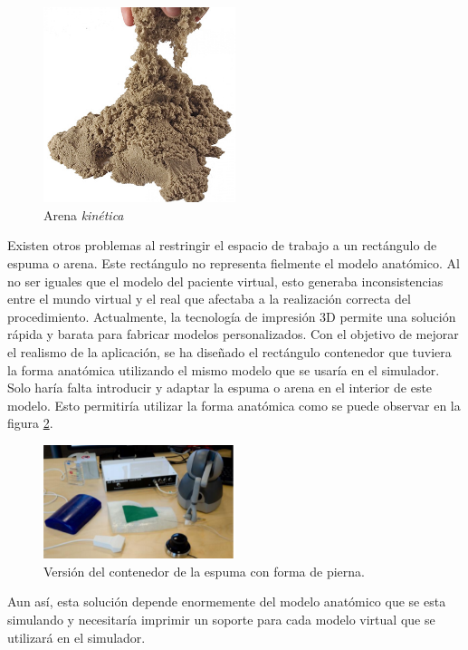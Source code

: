 \begin{figure}[h]
    \centering
    \includegraphics[width=0.5\textwidth]{IMG/arena.jpg}
    \caption{Arena \emph{kinética}}
    \label{fig:arena}
\end{figure}

Existen otros problemas al restringir el espacio de trabajo a un rectángulo de espuma o arena. Este rectángulo no representa fielmente el modelo anatómico. Al no ser iguales que el modelo del paciente virtual, esto generaba inconsistencias entre el mundo virtual y el real que afectaba a la realización correcta del procedimiento.
Actualmente, la tecnología de impresión 3D permite una solución rápida y barata para fabricar modelos personalizados. Con el objetivo de mejorar el realismo de la aplicación, se ha diseñado el rectángulo contenedor que tuviera la forma anatómica utilizando el mismo modelo que se usaría en el simulador. Solo haría falta introducir y adaptar la espuma o arena en el interior de este modelo. Esto permitiría utilizar la forma anatómica como se puede observar en la figura \ref{fig:pierna}. 

\begin{figure}[h]
    \centering
    \includegraphics[width=0.5\textwidth]{IMG/pierna.PNG}
    \caption{Versión del contenedor de la espuma con forma de pierna.}
    \label{fig:pierna}
\end{figure}

Aun así, esta solución depende enormemente del modelo anatómico que se esta simulando y necesitaría imprimir un soporte para cada modelo virtual que se utilizará en el simulador. 


